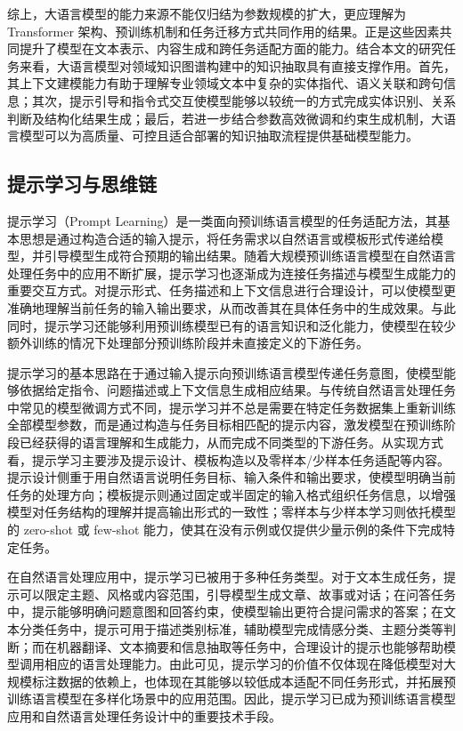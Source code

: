 综上，大语言模型的能力来源不能仅归结为参数规模的扩大，更应理解为 Transformer 架构、预训练机制和任务迁移方式共同作用的结果。正是这些因素共同提升了模型在文本表示、内容生成和跨任务适配方面的能力。结合本文的研究任务来看，大语言模型对领域知识图谱构建中的知识抽取具有直接支撑作用。首先，其上下文建模能力有助于理解专业领域文本中复杂的实体指代、语义关联和跨句信息；其次，提示引导和指令式交互使模型能够以较统一的方式完成实体识别、关系判断及结构化结果生成；最后，若进一步结合参数高效微调和约束生成机制，大语言模型可以为高质量、可控且适合部署的知识抽取流程提供基础模型能力。

\subsection{提示学习与思维链}

提示学习（Prompt Learning）是一类面向预训练语言模型的任务适配方法，其基本思想是通过构造合适的输入提示，将任务需求以自然语言或模板形式传递给模型，并引导模型生成符合预期的输出结果。随着大规模预训练语言模型在自然语言处理任务中的应用不断扩展，提示学习也逐渐成为连接任务描述与模型生成能力的重要交互方式\cite{Liu2021PretrainPrompt}。对提示形式、任务描述和上下文信息进行合理设计，可以使模型更准确地理解当前任务的输入输出要求，从而改善其在具体任务中的生成效果。与此同时，提示学习还能够利用预训练模型已有的语言知识和泛化能力，使模型在较少额外训练的情况下处理部分预训练阶段并未直接定义的下游任务\cite{Devlin2019BERT,Lewis2020BART,Brown2020FewShotLearners}。

提示学习的基本思路在于通过输入提示向预训练语言模型传递任务意图，使模型能够依据给定指令、问题描述或上下文信息生成相应结果。与传统自然语言处理任务中常见的模型微调方式不同，提示学习并不总是需要在特定任务数据集上重新训练全部模型参数，而是通过构造与任务目标相匹配的提示内容，激发模型在预训练阶段已经获得的语言理解和生成能力，从而完成不同类型的下游任务。从实现方式看，提示学习主要涉及提示设计、模板构造以及零样本/少样本任务适配等内容。提示设计侧重于用自然语言说明任务目标、输入条件和输出要求，使模型明确当前任务的处理方向；模板提示则通过固定或半固定的输入格式组织任务信息，以增强模型对任务结构的理解并提高输出形式的一致性；零样本与少样本学习则依托模型的 zero-shot 或 few-shot 能力，使其在没有示例或仅提供少量示例的条件下完成特定任务\cite{Schick2021ExploitingCloze,Gao2021MakingPretrainedBetterFewShot,Brown2020FewShotLearners}。

在自然语言处理应用中，提示学习已被用于多种任务类型。对于文本生成任务，提示可以限定主题、风格或内容范围，引导模型生成文章、故事或对话；在问答任务中，提示能够明确问题意图和回答约束，使模型输出更符合提问需求的答案；在文本分类任务中，提示可用于描述类别标准，辅助模型完成情感分类、主题分类等判断；而在机器翻译、文本摘要和信息抽取等任务中，合理设计的提示也能够帮助模型调用相应的语言处理能力。由此可见，提示学习的价值不仅体现在降低模型对大规模标注数据的依赖上，也体现在其能够以较低成本适配不同任务形式，并拓展预训练语言模型在多样化场景中的应用范围。因此，提示学习已成为预训练语言模型应用和自然语言处理任务设计中的重要技术手段\cite{Lewis2020BART,Brown2020FewShotLearners,Gao2021MakingPretrainedBetterFewShot}。

